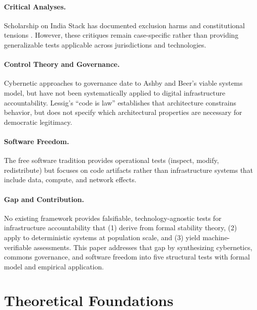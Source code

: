 \documentclass{article}
\begin{document}
\paragraph{Critical Analyses.} Scholarship on India Stack has documented exclusion harms \citep{khera2019} and constitutional tensions \citep{bhatia2019}. However, these critiques remain case-specific rather than providing generalizable tests applicable across jurisdictions and technologies.

\paragraph{Control Theory and Governance.} Cybernetic approaches to governance date to Ashby \citep{ashby1956} and Beer's viable systems model, but have not been systematically applied to digital infrastructure accountability. Lessig's ``code is law'' \citep{lessig2006} establishes that architecture constrains behavior, but does not specify which architectural properties are necessary for democratic legitimacy.

\paragraph{Software Freedom.} The free software tradition \citep{stallman2002} provides operational tests (inspect, modify, redistribute) but focuses on code artifacts rather than infrastructure systems that include data, compute, and network effects.

\paragraph{Gap and Contribution.} No existing framework provides falsifiable, technology-agnostic tests for infrastructure accountability that (1) derive from formal stability theory, (2) apply to deterministic systems at population scale, and (3) yield machine-verifiable assessments. This paper addresses that gap by synthesizing cybernetics, commons governance, and software freedom into five structural tests with formal model and empirical application.

\section{Theoretical Foundations}
\label{sec:theory}
\end{document}
